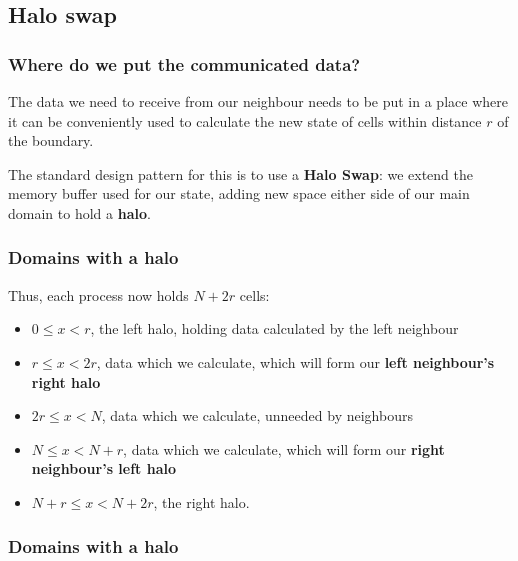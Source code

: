 \subsection{Halo swap}\label{halo-swap}

\subsubsection{Where do we put the communicated
data?}\label{where-do-we-put-the-communicated-data}

The data we need to receive from our neighbour needs to be put in a
place where it can be conveniently used to calculate the new state of
cells within distance $r$ of the boundary.

The standard design pattern for this is to use a \textbf{Halo Swap}: we
extend the memory buffer used for our state, adding new space either
side of our main domain to hold a \textbf{halo}.

\subsubsection{Domains with a halo}\label{domains-with-a-halo}

Thus, each process now holds $N+2r$ cells:

\begin{itemize}
\itemsep1pt\parskip0pt
\item
  $0 \le x < r$, the left halo, holding data calculated by the left
  neighbour
\item
  $r \le x < 2r$, data which we calculate, which will form our
  \textbf{left neighbour's right halo}
\item
  $2r \le x < N$, data which we calculate, unneeded by neighbours
\item
  $N \le x < N+r$, data which we calculate, which will form our
  \textbf{right neighbour's left halo}
\item
  $N+r \le x < N+2r$, the right halo.
\end{itemize}

\subsubsection{Domains with a halo}\label{domains-with-a-halo-1}

\begin{Shaded}
\begin{Highlighting}[]

       
       
\end{Highlighting}
\end{Shaded}


